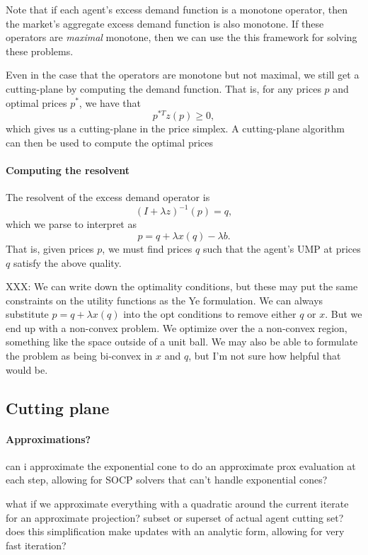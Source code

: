 \documentclass[12pt]{article}
\begin{document}
Note that if each agent's excess demand function is a monotone operator, then
the market's aggregate excess demand function is also monotone. If these
operators are \emph{maximal} monotone, then we can use the this framework for
solving these problems.

Even in the case that the operators are monotone but not maximal, we still get
a cutting-plane by computing the demand function. That is, for any prices $p$
and optimal prices $p^*$, we have that
\[
p^{*T} z(p) \geq 0,
\]
which gives us a cutting-plane in the price simplex.
A cutting-plane algorithm can then be used to compute the optimal prices

\paragraph{Computing the resolvent}
The resolvent of the excess demand operator is
\[
(I + \lambda z)^{-1}(p) = q,
\]
which we parse to interpret as
\[
p = q + \lambda x(q) - \lambda b.
\]
That is, given prices $p$, we must find prices $q$ such that the agent's UMP
at prices $q$ satisfy the above quality.

XXX: We can write down the optimality conditions, but these may put the same
constraints on the utility functions as the Ye formulation. We can always
substitute $p = q + \lambda x(q)$ into the opt conditions to remove either
$q$ or $x$. But we end up with a non-convex problem. We optimize over the a
non-convex region, something like the space outside of a unit ball.
We may also be able to formulate the problem as being bi-convex in $x$ and $q$,
but I'm not sure how helpful that would be.

\subsection{Cutting plane}
\paragraph{Approximations?}
can i approximate the exponential cone to do an approximate prox evaluation
at each step, allowing for SOCP solvers that can't handle exponential cones?

what if we approximate everything with a quadratic around the current iterate
for an approximate projection? subset or superset of actual agent cutting set?
does this simplification make updates with an analytic form, allowing for very
fast iteration?
\end{document}
